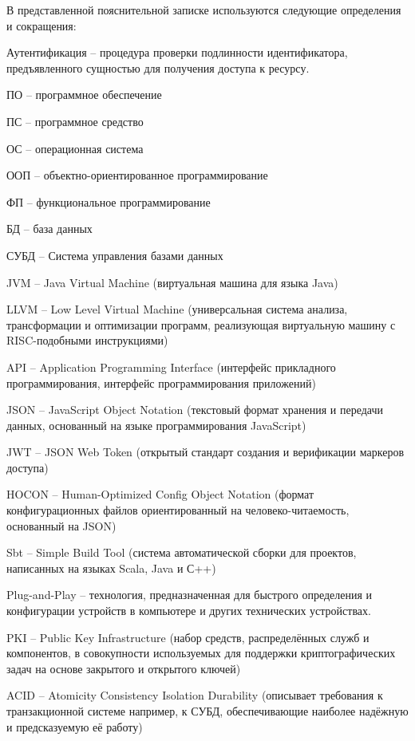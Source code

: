 
В представленной пояснительной записке используются следующие определения и сокращения:

Аутентификация -- процедура проверки подлинности идентификатора, предъявленного сущностью для получения доступа к ресурсу.

ПО -- программное обеспечение

ПС -- программное средство

ОС -- операционная система

ООП -- объектно-ориентированное программирование

ФП -- функциональное программирование

БД -- база данных

СУБД -- Система управления базами данных

JVM -- Java Virtual Machine (виртуальная машина для языка Java)

LLVM -- Low Level Virtual Machine (универсальная система анализа, трансформации и оптимизации программ, реализующая виртуальную машину с RISC-подобными инструкциями)

API -- Application Programming Interface (интерфейс прикладного программирования, интерфейс программирования приложений)

JSON -- JavaScript Object Notation (текстовый формат хранения и передачи данных, основанный на языке программирования JavaScript)

JWT -- JSON Web Token (открытый стандарт создания и верификации маркеров доступа)

HOCON -- Human-Optimized Config Object Notation (формат конфигурационных файлов ориентированный на человеко-читаемость, основанный на JSON)

Sbt -- Simple Build Tool (система автоматической сборки для проектов, написанных на языках Scala, Java и С++)

Plug-and-Play -- технология, предназначенная для быстрого определения и конфигурации устройств в компьютере и других технических устройствах.

PKI -- Public Key Infrastructure (набор средств, распределённых служб и компонентов, в совокупности используемых для поддержки криптографических задач на основе закрытого и открытого ключей)

ACID -- Atomicity Consistency Isolation Durability  (описывает требования к транзакционной системе например, к СУБД, обеспечивающие наиболее надёжную и предсказуемую её работу)

\clearpage